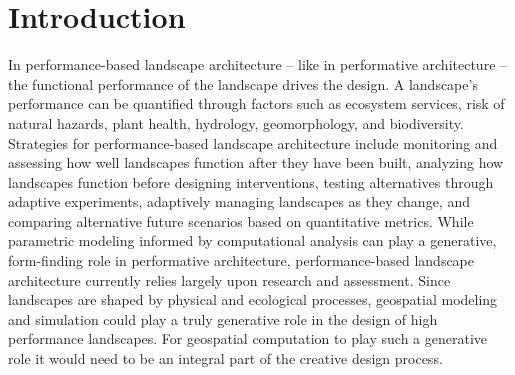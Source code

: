\documentclass[Afour,sagev,times]{sagej} %
\begin{document}

\maketitle


\section{Introduction}

In performance-based landscape architecture 
-- like in performative architecture \cite{Kolarevic2005} --
the functional performance of the landscape drives the design.
A landscape's performance 
can be quantified through factors such as
ecosystem services, risk of natural hazards, plant health, 
hydrology, geomorphology, and biodiversity. 
Strategies for performance-based landscape architecture include
monitoring and assessing how well landscapes function
after they have been built, \cite{Yang2016}
analyzing how landscapes function before designing interventions,
testing alternatives through adaptive experiments,
adaptively managing landscapes as they change, 
and comparing alternative future scenarios 
based on quantitative metrics. \cite{Lovell2015}
While parametric modeling informed by computational analysis 
can play a generative, form-finding role 
in performative architecture, 
performance-based landscape architecture 
currently relies largely upon research and assessment.
Since landscapes are shaped by physical and ecological processes,
geospatial modeling and simulation could play a truly generative role 
in the design of high performance landscapes.
%
For geospatial computation to 
play such a generative role
it would need to be an integral part 
of the creative design process.
\end{document}
